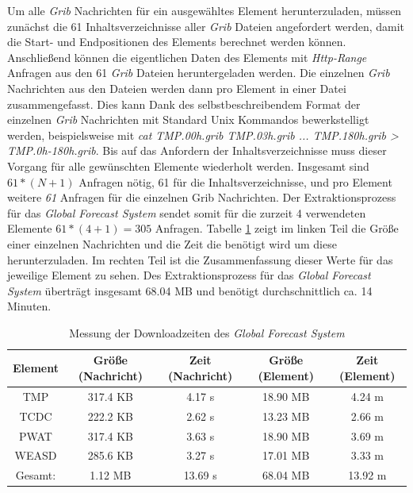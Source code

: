 Um alle \textit{Grib} Nachrichten für ein ausgewähltes Element
herunterzuladen, müssen zunächst die 61 Inhaltsverzeichnisse aller
\textit{Grib} Dateien angefordert werden, damit die Start- und
Endpositionen des Elements berechnet werden können. Anschließend
können die eigentlichen Daten des Elements mit \textit{Http-Range}
Anfragen aus den 61 \textit{Grib} Dateien heruntergeladen werden. Die
einzelnen \textit{Grib} Nachrichten aus den Dateien werden dann pro
Element in einer Datei zusammengefasst. Dies kann Dank des
selbstbeschreibendem Format der einzelnen \textit{Grib} Nachrichten
mit Standard Unix Kommandos bewerkstelligt werden, beispielsweise mit
\textit{cat TMP.00h.grib TMP.03h.grib ... TMP.180h.grib >
  TMP.0h-180h.grib}. Bis auf das Anfordern der Inhaltsverzeichnisse
muss dieser Vorgang für alle gewünschten Elemente wiederholt
werden. Insgesamt sind $ 61 * (N+1) $ Anfragen nötig, 61 für die
Inhaltsverzeichnisse, und pro Element weitere \textit{61} Anfragen für
die einzelnen Grib Nachrichten. Der Extraktionsprozess für das
\textit{Global Forecast System} sendet somit für die zurzeit 4
verwendeten Elemente $ 61 * (4+1) = 305$ Anfragen. Tabelle
\ref{tab:download_messung_gfs} zeigt im linken Teil die Größe einer
einzelnen Nachrichten und die Zeit die benötigt wird um diese
herunterzuladen. Im rechten Teil ist die Zusammenfassung dieser Werte
für das jeweilige Element zu sehen. Des Extraktionsprozess für das
\textit{Global Forecast System} überträgt insgesamt 68.04 MB und
benötigt durchschnittlich ca. 14 Minuten.

\begin{table}[h]
  \centering
  {\sf
    \footnotesize
    \begin{longtable}{@{}ccccc}
      \toprule
      \textbf{Element} & \textbf{Größe (Nachricht)} & \textbf{Zeit (Nachricht)} & \textbf{Größe (Element)} & \textbf{Zeit (Element)} \\
      \midrule
      TMP   & 317.4 KB & 4.17 s & 18.90 MB & 4.24 m \\
      TCDC  & 222.2 KB & 2.62 s & 13.23 MB & 2.66 m \\
      PWAT  & 317.4 KB & 3.63 s & 18.90 MB & 3.69 m \\
      WEASD & 285.6 KB & 3.27 s & 17.01 MB & 3.33 m \\
      \midrule
      Gesamt: & 1.12 MB  & 13.69 s & 68.04 MB & 13.92 m \\
      \bottomrule
    \end{longtable}
  }
  \caption{Messung der Downloadzeiten des \textit{Global Forecast System}}
  \label{tab:download_messung_gfs}
\end{table}

